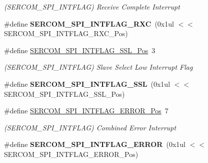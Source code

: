 \begin{DoxyCompactItemize}
\begin{DoxyCompactList}\small\item\em (S\+E\+R\+C\+O\+M\+\_\+\+S\+P\+I\+\_\+\+I\+N\+T\+F\+L\+A\+G) Receive Complete Interrupt \end{DoxyCompactList}\item 
\hypertarget{group___s_a_m_l21___s_e_r_c_o_m_gaf34eb63b3eb9a846131d88cf087c6a12}{}\#define {\bfseries S\+E\+R\+C\+O\+M\+\_\+\+S\+P\+I\+\_\+\+I\+N\+T\+F\+L\+A\+G\+\_\+\+R\+X\+C}~(0x1ul $<$$<$ S\+E\+R\+C\+O\+M\+\_\+\+S\+P\+I\+\_\+\+I\+N\+T\+F\+L\+A\+G\+\_\+\+R\+X\+C\+\_\+\+Pos)\label{group___s_a_m_l21___s_e_r_c_o_m_gaf34eb63b3eb9a846131d88cf087c6a12}

\item 
\hypertarget{group___s_a_m_l21___s_e_r_c_o_m_ga681eca0d458ada0abe7e06ab04a64845}{}\#define \hyperlink{group___s_a_m_l21___s_e_r_c_o_m_ga681eca0d458ada0abe7e06ab04a64845}{S\+E\+R\+C\+O\+M\+\_\+\+S\+P\+I\+\_\+\+I\+N\+T\+F\+L\+A\+G\+\_\+\+S\+S\+L\+\_\+\+Pos}~3\label{group___s_a_m_l21___s_e_r_c_o_m_ga681eca0d458ada0abe7e06ab04a64845}

\begin{DoxyCompactList}\small\item\em (S\+E\+R\+C\+O\+M\+\_\+\+S\+P\+I\+\_\+\+I\+N\+T\+F\+L\+A\+G) Slave Select Low Interrupt Flag \end{DoxyCompactList}\item 
\hypertarget{group___s_a_m_l21___s_e_r_c_o_m_gaaa670c0986f911750316466866c5b9b5}{}\#define {\bfseries S\+E\+R\+C\+O\+M\+\_\+\+S\+P\+I\+\_\+\+I\+N\+T\+F\+L\+A\+G\+\_\+\+S\+S\+L}~(0x1ul $<$$<$ S\+E\+R\+C\+O\+M\+\_\+\+S\+P\+I\+\_\+\+I\+N\+T\+F\+L\+A\+G\+\_\+\+S\+S\+L\+\_\+\+Pos)\label{group___s_a_m_l21___s_e_r_c_o_m_gaaa670c0986f911750316466866c5b9b5}

\item 
\hypertarget{group___s_a_m_l21___s_e_r_c_o_m_gaaf91dcd712b74597bfebde07e896e5f4}{}\#define \hyperlink{group___s_a_m_l21___s_e_r_c_o_m_gaaf91dcd712b74597bfebde07e896e5f4}{S\+E\+R\+C\+O\+M\+\_\+\+S\+P\+I\+\_\+\+I\+N\+T\+F\+L\+A\+G\+\_\+\+E\+R\+R\+O\+R\+\_\+\+Pos}~7\label{group___s_a_m_l21___s_e_r_c_o_m_gaaf91dcd712b74597bfebde07e896e5f4}

\begin{DoxyCompactList}\small\item\em (S\+E\+R\+C\+O\+M\+\_\+\+S\+P\+I\+\_\+\+I\+N\+T\+F\+L\+A\+G) Combined Error Interrupt \end{DoxyCompactList}\item 
\hypertarget{group___s_a_m_l21___s_e_r_c_o_m_ga51c80f2a7502ea3ccdab45691d88a20a}{}\#define {\bfseries S\+E\+R\+C\+O\+M\+\_\+\+S\+P\+I\+\_\+\+I\+N\+T\+F\+L\+A\+G\+\_\+\+E\+R\+R\+O\+R}~(0x1ul $<$$<$ S\+E\+R\+C\+O\+M\+\_\+\+S\+P\+I\+\_\+\+I\+N\+T\+F\+L\+A\+G\+\_\+\+E\+R\+R\+O\+R\+\_\+\+Pos)\label{group___s_a_m_l21___s_e_r_c_o_m_ga51c80f2a7502ea3ccdab45691d88a20a}


\end{DoxyCompactItemize}
